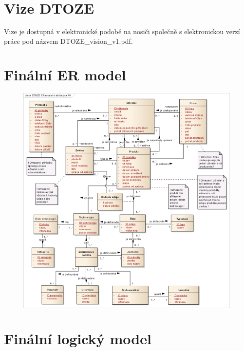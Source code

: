 \documentclass[11pt,a4paper]{article}
\begin{document}
\newpage
\section{Vize DTOZE\label{attach:DTOZE-vize}}
Vize je dostupná v elektronické podobě na nosiči společně s elektronickou verzí práce pod názvem DTOZE\_vision\_v1.pdf. 

\section{Finální ER model \label{attach:DTOZE-ER}}

\begin{figure}[H] 
\centering  
\includegraphics[scale=0.75]{DTOZE_ER_final_n} 
\end{figure} 

\section{Finální logický model\label{attach:DTOZE-log}}
\end{document}
